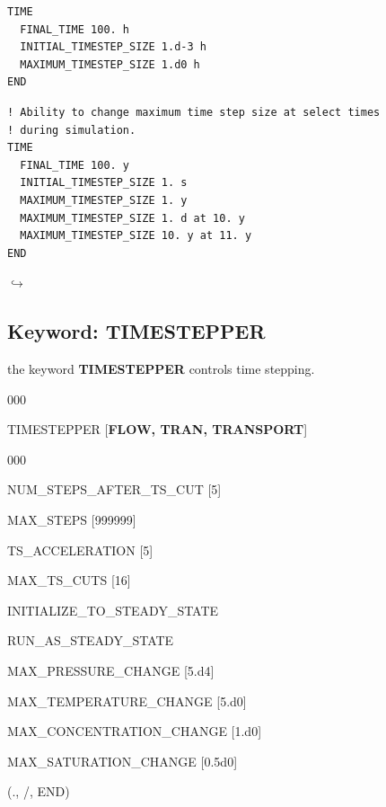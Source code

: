 \documentclass[12pt]{article}
\newcommand\return{{\hfill$\hookrightarrow$}}
\begin{document}

\begin{verbatim}
TIME
  FINAL_TIME 100. h
  INITIAL_TIMESTEP_SIZE 1.d-3 h
  MAXIMUM_TIMESTEP_SIZE 1.d0 h
END
\end{verbatim}

\begin{verbatim}
! Ability to change maximum time step size at select times 
! during simulation.
TIME
  FINAL_TIME 100. y
  INITIAL_TIMESTEP_SIZE 1. s
  MAXIMUM_TIMESTEP_SIZE 1. y
  MAXIMUM_TIMESTEP_SIZE 1. d at 10. y
  MAXIMUM_TIMESTEP_SIZE 10. y at 11. y
END
\end{verbatim}
\hyperlink{target_key}{\return}


\newpage
\protect\hypertarget{target_timestep}{}

\subsection{Keyword: TIMESTEPPER}

 the keyword {\bf TIMESTEPPER} controls time stepping.

\begin{deflist}{000}
\item[TIMESTEPPER] [{\bf FLOW, TRAN, TRANSPORT}]
\begin{deflist}{000}
\item[NUM\_STEPS\_AFTER\_TS\_CUT] [5]
\item[MAX\_STEPS] [999999]
\item[TS\_ACCELERATION] [5]
\item[MAX\_TS\_CUTS] [16]
\item[INITIALIZE\_TO\_STEADY\_STATE]
\item[RUN\_AS\_STEADY\_STATE]
\item[MAX\_PRESSURE\_CHANGE] [5.d4]
\item[MAX\_TEMPERATURE\_CHANGE] [5.d0]
\item[MAX\_CONCENTRATION\_CHANGE] [1.d0]
\item[MAX\_SATURATION\_CHANGE] [0.5d0]
\end{deflist}
\item[(., /, END)]
\end{deflist}


\end{document}
